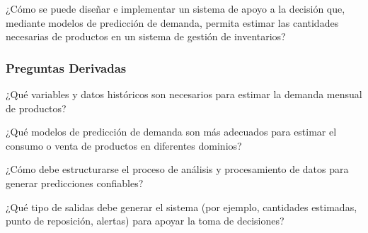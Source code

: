 ¿Cómo se puede diseñar e implementar un sistema de apoyo a la decisión que, mediante modelos de predicción de demanda, permita estimar las cantidades necesarias de productos en un sistema de gestión de inventarios?



    
    
    

\subsubsection{Preguntas Derivadas}

¿Qué variables y datos históricos son necesarios para estimar la demanda mensual de productos?

¿Qué modelos de predicción de demanda son más adecuados para estimar el consumo o venta de productos en diferentes dominios?

¿Cómo debe estructurarse el proceso de análisis y procesamiento de datos para generar predicciones confiables?

¿Qué tipo de salidas debe generar el sistema (por ejemplo, cantidades estimadas, punto de reposición, alertas) para apoyar la toma de decisiones?
